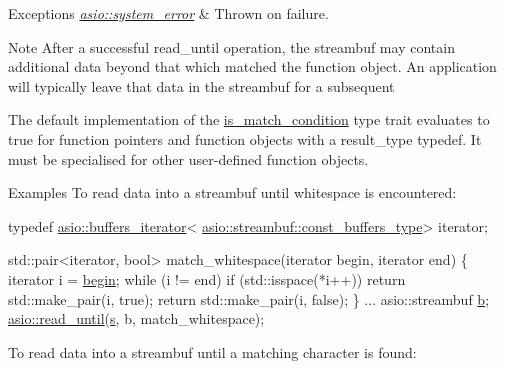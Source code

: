 \begin{DoxyExceptions}{Exceptions}
{\em \hyperlink{classasio_1_1system__error}{asio\+::system\+\_\+error}} & Thrown on failure.\\
\hline
\end{DoxyExceptions}
\begin{DoxyNote}{Note}
After a successful read\+\_\+until operation, the streambuf may contain additional data beyond that which matched the function object. An application will typically leave that data in the streambuf for a subsequent

The default implementation of the {\ttfamily \hyperlink{structasio_1_1is__match__condition}{is\+\_\+match\+\_\+condition}} type trait evaluates to true for function pointers and function objects with a {\ttfamily result\+\_\+type} typedef. It must be specialised for other user-\/defined function objects.
\end{DoxyNote}
\begin{DoxyParagraph}{Examples}
To read data into a streambuf until whitespace is encountered\+: 
\begin{DoxyCode}
 \textcolor{keyword}{typedef} \hyperlink{classasio_1_1buffers__iterator}{asio::buffers\_iterator}<
    \hyperlink{classasio_1_1const__buffers__1}{asio::streambuf::const\_buffers\_type}> iterator;

std::pair<iterator, bool>
match\_whitespace(iterator begin, iterator end)
\{
  iterator i = \hyperlink{group__async__connect_ga7055bca9225050c030c19c7dc926fa53}{begin};
  \textcolor{keywordflow}{while} (i != end)
    \textcolor{keywordflow}{if} (std::isspace(*i++))
      \textcolor{keywordflow}{return} std::make\_pair(i, \textcolor{keyword}{true});
  \textcolor{keywordflow}{return} std::make\_pair(i, \textcolor{keyword}{false});
\}
...
asio::streambuf \hyperlink{group__async__read_ga945a5c18fa77a9e2eba420f8f44b2a4f}{b};
\hyperlink{group__read__until_ga1aae2baa82596a6a9ad320e80b016006}{asio::read\_until}(\hyperlink{group__async__connect_ga31ab74b9ea6c77932dddd016cfc7920a}{s}, b, match\_whitespace);
\end{DoxyCode}

\end{DoxyParagraph}
To read data into a streambuf until a matching character is found\+: 
